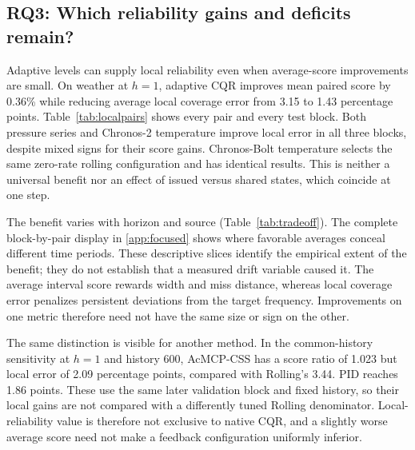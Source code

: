 \begin{table}[!htbp]\centering\small
\caption{Common-history weather comparison at $h=24$, four pairs. All rows use
the same post-startup validation block and unchanged test origins. Each IS ratio
uses its matched Rolling method within that history search; coverage is percent
and Local is percentage points.}
\label{tab:history}
\end{table}

\subsection{RQ3: Which reliability gains and deficits remain?}\label{sec:rolling}
Adaptive levels can supply local reliability even when average-score improvements
are small. On weather at $h=1$, adaptive CQR improves mean paired score by 0.36\%
while reducing average local coverage error from 3.15 to 1.43 percentage points.
Table~\ref{tab:localpairs} shows every pair and every test block. Both pressure
series and Chronos-2 temperature improve local error in all three blocks, despite
mixed signs for their score gains. Chronos-Bolt temperature selects the same
zero-rate rolling configuration and has identical results. This is neither a
universal benefit nor an effect of issued versus shared states, which coincide
at one step.

\begin{table}[!htbp]\centering\scriptsize
\caption{Weather $h=1$: adaptive CQR versus selected-window Rolling. Gain is
paired score improvement (\%). Whole-test local errors and their block improvements
are percentage points; positive block values favor ACI. All configurations are
selected before testing.}
\label{tab:localpairs}\end{table}

The benefit varies with horizon and source (Table~\ref{tab:tradeoff}). The complete
block-by-pair display in \ref{app:focused} shows where favorable averages conceal
different time periods. These descriptive slices identify the empirical extent
of the benefit; they do not establish that a measured drift variable caused it.
The average interval score rewards width and miss distance, whereas local coverage
error penalizes persistent deviations from the target frequency. Improvements on
one metric therefore need not have the same size or sign on the other.

The same distinction is visible for another method. In the common-history
sensitivity at $h=1$ and history 600, AcMCP-CSS has a score ratio of 1.023 but
local error of 2.09 percentage points, compared with Rolling's 3.44. PID reaches
1.86 points. These use the same later validation block and fixed history, so
their local gains are not compared with a differently tuned Rolling denominator.
Local-reliability value is therefore not exclusive to native CQR, and a slightly
worse average score need not make a feedback configuration uniformly inferior.

